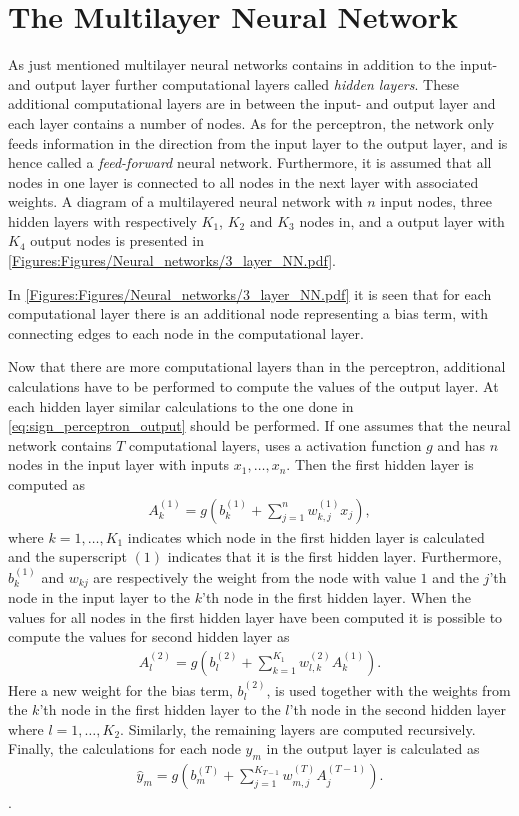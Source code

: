 \section{The Multilayer Neural Network}
As just mentioned multilayer neural networks contains in addition to the input- and output layer further computational layers called \emph{hidden layers}. These additional computational layers are in between the input- and output layer and each layer contains a number of nodes. As for the perceptron, the network only feeds information in the direction from the input layer to the output layer, and is hence called a \emph{feed-forward} neural network. Furthermore, it is assumed that all nodes in one layer is connected to all nodes in the next layer with associated weights. A diagram of a multilayered neural network with $n$ input nodes, three hidden layers with respectively $K_1$, $K_2$ and $K_3$ nodes in, and a output layer with $K_4$ output nodes is presented in \autoref{Figures:Figures/Neural_networks/3_layer_NN.pdf}.

In \autoref{Figures:Figures/Neural_networks/3_layer_NN.pdf} it is seen that for each computational layer there is an additional node representing a bias term, with connecting edges to each node in the computational layer.

Now that there are more computational layers than in the perceptron, additional calculations have to be performed to compute the values of the output layer. At each hidden layer similar calculations to the one done in \eqref{eq:sign_perceptron_output} should be performed. If one assumes that the neural network contains $T$ computational layers, uses a activation function $g$ and has $n$ nodes in the input layer with inputs $x_1,\ldots, x_n$. Then the first hidden layer is computed as
\begin{align*}
    A^{(1)}_k = g\left(b_{k}^{(1)} + \sum_{j=1}^n w_{k,j}^{(1)}x_j\right),
\end{align*}
where $k = 1,\ldots,K_1$ indicates which node in the first hidden layer is calculated and the superscript $(1)$ indicates that it is the first hidden layer. Furthermore, $b_{k}^{(1)}$ and $w_{kj}$ are respectively the weight from the node with value $1$ and the $j$'th node in the input layer to the $k$'th node in the first hidden layer. When the values for all nodes in the first hidden layer have been computed it is possible to compute the values for second hidden layer as
\begin{align*}
    A^{(2)}_l = g\left(b_{l}^{(2)} + \sum_{k=1}^{K_1} w_{l,k}^{(2)}A_k^{(1)}\right).
\end{align*}
Here a new weight for the bias term, $b_{l}^{(2)}$, is used together with the weights from the $k$'th node in the first hidden layer to the $l$'th node in the second hidden layer where $l = 1,\ldots, K_2$. Similarly, the remaining layers are computed recursively. Finally, the calculations for each node $\hat{y}_m$ in the output layer is calculated as
\begin{align*}
    \hat{y}_m = g\left(b_{m}^{(T)} + \sum_{j=1}^{K_{T-1}} w_{m,j}^{(T)}A_j^{(T-1)}\right).
\end{align*}.

